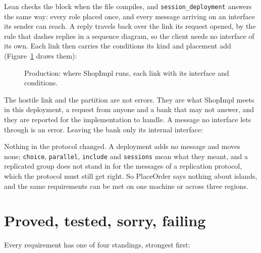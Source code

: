 Lean checks the block when the file compiles, and \texttt{session\_deployment} answers the same
way: every role placed once, and every message arriving on an interface its sender can reach. A
reply travels back over the link its request opened, by the rule that dashes replies in a
sequence diagram, so the client needs no interface of its own. Each link then carries the
conditions its kind and placement add (Figure~\ref{fig:deployment} draws them):


\begin{figure}[ht]\centering
{}
\caption{Production: where ShopImpl runs, each link with its interface and conditions.}
\label{fig:deployment}
\end{figure}

The hostile link and the partition are not errors. They are what ShopImpl meets in this
deployment, a request from anyone and a bank that may not answer, and they are reported for the
implementation to handle. A message no interface lets through is an error. Leaving the bank only
its internal interface:


Nothing in the protocol changed. A deployment adds no message and moves none; \texttt{choice},
\texttt{parallel}, \texttt{include} and \texttt{sessions} mean what they meant, and a replicated
group does not stand in for the messages of a replication protocol, which the protocol must
still get right. So PlaceOrder says nothing about islands, and the same requirements can be met
on one machine or across three regions.

\section{Proved, tested, sorry, failing}

Every requirement has one of four standings, strongest first:

